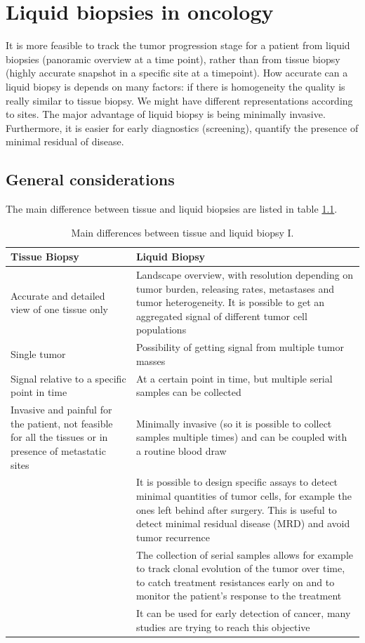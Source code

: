\graphicspath{{chapters/notes/08/images/}}
\chapter{Liquid biopsies in oncology}
It is more feasible to track the tumor progression stage for a patient from liquid biopsies (panoramic overview at a time point), rather than from tissue biopsy (highly accurate snapshot in a specific site at a timepoint). How accurate can a liquid biopsy is depends on many factors: if there is homogeneity the quality is really similar to tissue biopsy. We might have different representations according to sites. The major advantage of liquid biopsy is being minimally invasive. Furthermore, it is easier for early diagnostics (screening), quantify the presence of minimal residual of disease.

\section{General considerations}
The main difference between tissue and liquid biopsies are listed in table \ref{tab:diff1}.
\begin{table}[H]
\centering

\begin{tabular}{ | p{4cm} | p{9cm} | }
 \hline
 \textbf{Tissue Biopsy} & \textbf{Liquid Biopsy} \\
 \hline
 \hline
 Accurate and detailed view of one tissue only & Landscape overview, with resolution depending on tumor burden, releasing rates, metastases and tumor heterogeneity. It is possible to get an aggregated signal of different tumor cell populations \\
 \hline
 Single tumor & Possibility of getting signal from multiple tumor masses \\
 \hline
 Signal relative to a specific point in time & At a certain point in time, but multiple serial samples can be collected \\
 \hline
 Invasive and painful for the patient, not feasible for all the tissues or in presence of metastatic sites & Minimally invasive (so it is possible to collect samples multiple times) and can be coupled with a routine blood draw \\
 \hline
 & It is possible to design specific assays to detect minimal quantities of tumor cells, for example the ones left behind after surgery. This is useful to detect minimal residual disease (MRD) and avoid tumor recurrence \\
 \hline
 & The collection of serial samples allows for example to track clonal evolution of the tumor over time, to catch treatment resistances early on and to monitor the patient's response to the treatment \\
 \hline
 & It can be used for early detection of cancer, many studies are trying to reach this objective \\
 \hline
\end{tabular}
\caption{Main differences between tissue and liquid biopsy I.}
\label{tab:diff1}
\end{table}



